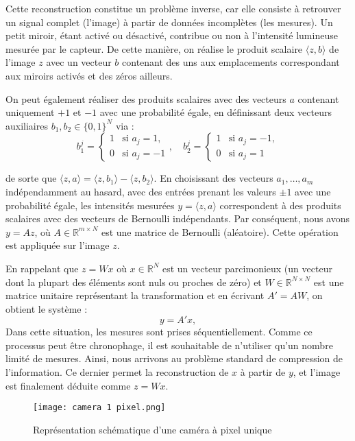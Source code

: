 \documentclass[a4paper, 12pt]{report} %
\begin{document}
Cette reconstruction constitue un problème inverse, car elle consiste à retrouver un signal complet (l'image) à partir de données incomplètes (les mesures). Un petit miroir, étant activé ou désactivé, contribue ou non à l'intensité lumineuse mesurée par le capteur. De cette manière, on réalise le produit scalaire \( \langle z, b \rangle \) de l'image \( z \) avec un vecteur \( b \) contenant des uns aux emplacements correspondant aux miroirs activés et des zéros ailleurs.

On peut également réaliser des produits scalaires avec des vecteurs \( a \) contenant uniquement \( +1 \) et \( -1 \) avec une probabilité égale, en définissant deux vecteurs auxiliaires \( b_1, b_2 \in \{0,1\}^N \) via :
\[
b_1^j = 
\begin{cases} 
1 & \text{si } a_j = 1, \\
0 & \text{si } a_j = -1 
\end{cases}, \quad
b_2^j = 
\begin{cases} 
1 & \text{si } a_j = -1, \\
0 & \text{si } a_j = 1 
\end{cases}
\]

de sorte que \( \langle z, a \rangle = \langle z, b_1 \rangle - \langle z, b_2 \rangle \). En choisissant des vecteurs \( a_1, \ldots, a_m \) indépendamment au hasard, avec des entrées prenant les valeurs \( \pm 1 \) avec une probabilité égale, les intensités mesurées \( y = \langle z, a \rangle \) correspondent à des produits scalaires avec des vecteurs de Bernoulli indépendants. Par conséquent, nous avons \( y = Az \), où \( A \in \mathbb{R}^{m \times N} \) est une matrice de Bernoulli (aléatoire). Cette opération est appliquée sur l'image \( z \).


En rappelant que \( z = Wx \) où \( x \in \mathbb{R}^N \) est un vecteur parcimonieux (un vecteur dont la plupart des éléments sont nuls ou proches de zéro)  et \( W \in \mathbb{R}^{N \times N} \) est une matrice unitaire représentant la transformation 
et en écrivant \( A' = AW \), on obtient le système :
\[
y = A'x,
\]
 Dans cette situation, les mesures sont prises séquentiellement. Comme ce processus peut être chronophage, il est souhaitable de n'utiliser qu'un nombre limité de mesures. Ainsi, nous arrivons au problème standard de compression de l'information. Ce dernier permet la reconstruction de \( x \) à partir de \( y \), et l'image est finalement déduite comme \( z = Wx \).


\begin{figure}[H] %
    \centering
    \texttt{[image: camera 1 pixel.png]}
    \caption{Représentation schématique d'une caméra à pixel unique  \cite{foucart2013invitation}}
    \label{fig:1}
\end{figure}
\end{document}
